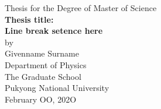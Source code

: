 \thispagestyle{empty}

\begin{center}
{\fontsize{14pt}{14}\selectfont
Thesis for the Degree of Master of Science}\\[1.5cm]
{\fontsize{22pt}{22}\selectfont
\textbf{Thesis title:\\
    Line break setence here}\\[7cm]}
{\fontsize{14pt}{12}\selectfont
by\\[0.5cm]
Givenname Surname\\[0.5cm]
Department of Physics\\[0.5cm]
The Graduate School\\[0.5cm]
Pukyong National University
\\[1cm]}
{\fontsize{12pt}{14}\selectfont
February OO, 202O}\\[1cm]
\end{center}

\newpage
